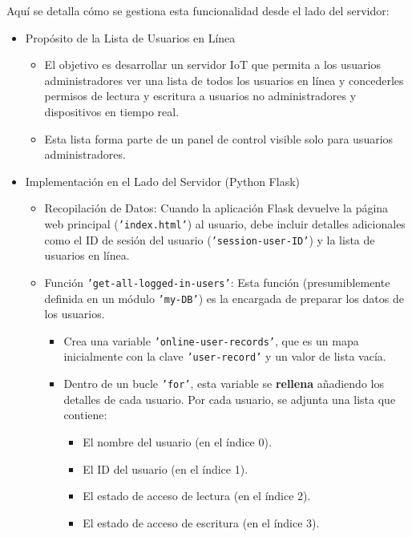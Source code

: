 \documentclass{report}
\begin{document}
Aquí se detalla cómo se gestiona esta funcionalidad desde el lado del servidor:
\begin{itemize}
    \item Propósito de la Lista de Usuarios en Línea
        \begin{itemize}
            \item El objetivo es desarrollar un servidor IoT que permita a los usuarios administradores ver una lista de todos los usuarios en 
            línea y concederles permisos de lectura y escritura a usuarios no administradores y dispositivos en tiempo real.
            \item Esta lista forma parte de un panel de control visible solo para usuarios administradores.
        \end{itemize}

    \item Implementación en el Lado del Servidor (Python Flask)
        \begin{itemize}
            \item Recopilación de Datos: Cuando la aplicación Flask devuelve la página web principal (\texttt{'index.html'}) al usuario, debe incluir 
            detalles adicionales como el ID de sesión del usuario (\texttt{'session-user-ID'}) y la lista de usuarios en línea.
            \item Función \texttt{'get-all-logged-in-users'}: Esta función (presumiblemente definida en un módulo \texttt{'my-DB'}) es la encargada de 
            preparar los datos de los usuarios.
                \begin{itemize}
                    \item Crea una variable \texttt{'online-user-records'}, que es un mapa inicialmente con la clave \texttt{'user-record'} y un valor de 
                    lista vacía.
                    \item Dentro de un bucle \texttt{'for'}, esta variable se \textbf{rellena} añadiendo los detalles de cada usuario. Por cada usuario, se 
                    adjunta una lista que contiene:
                        \begin{itemize}
                            \item El nombre del usuario (en el índice 0).
                            \item El ID del usuario (en el índice 1).
                            \item El estado de acceso de lectura (en el índice 2).
                            \item El estado de acceso de escritura (en el índice 3).                        

\end{itemize}
\end{itemize}
\end{itemize}
\end{itemize}
\end{document}
